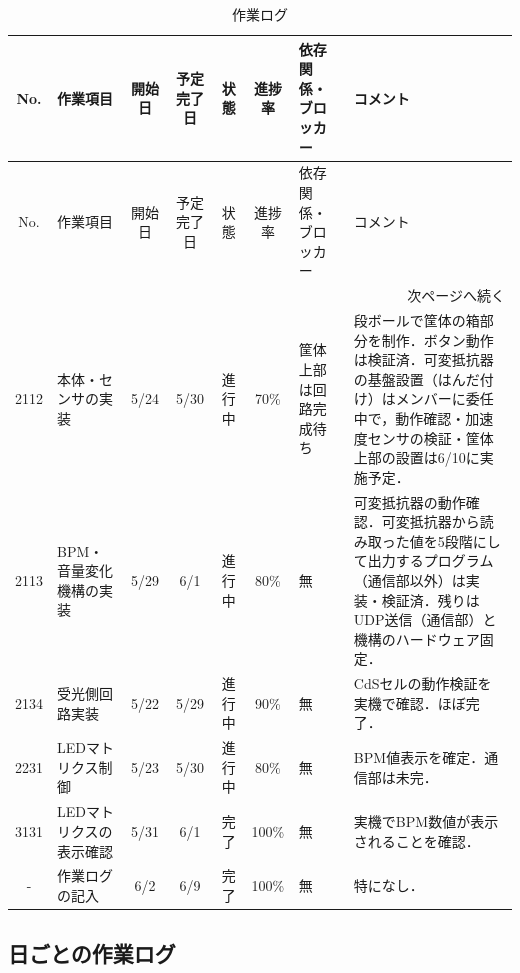 \documentclass[uplatex,dvipdfmx,a4paper,11pt]{jsarticle}
\begin{document}
\renewcommand{\arraystretch}{1.2}

\small

\begin{longtable}{|c|p{2.2cm}|c|c|c|c|p{2.4cm}|p{3.1cm}|}
\caption{作業ログ} \\
\hline
No. & 作業項目 & 開始日 & 予定完了日 & 状態 & 進捗率 & 依存関係・ブロッカー & コメント \\
\hline
\endfirsthead

\hline
No. & 作業項目 & 開始日 & 予定完了日 & 状態 & 進捗率 & 依存関係・ブロッカー & コメント \\
\hline
\endhead

\hline
\multicolumn{8}{r}{次ページへ続く} \\
\hline
\endfoot

\hline
\endlastfoot

2112 &
本体・センサの実装 &
5/24 &
5/30 &
進行中 &
70\% &
筐体上部は回路完成待ち &
段ボールで筐体の箱部分を制作．ボタン動作は検証済．可変抵抗器の基盤設置（はんだ付け）はメンバーに委任中で，動作確認・加速度センサの検証・筐体上部の設置は6/10に実施予定． \\
\hline

2113 &
BPM・音量変化機構の実装 &
5/29 &
6/1 &
進行中 &
80\% &
無 &
可変抵抗器の動作確認．可変抵抗器から読み取った値を5段階にして出力するプログラム（通信部以外）は実装・検証済．残りはUDP送信（通信部）と機構のハードウェア固定． \\
\hline

2134 &
受光側回路実装 &
5/22 &
5/29 &
進行中 &
90\% &
無 &
CdSセルの動作検証を実機で確認．ほぼ完了．\\
\hline

2231 &
LEDマトリクス制御 &
5/23 &
5/30 &
進行中 &
80\% &
無 &
BPM値表示を確定．通信部は未完． \\
\hline

3131 &
LEDマトリクスの表示確認 &
5/31 &
6/1 &
完了 &
100\% &
無 &
実機でBPM数値が表示されることを確認． \\
\hline

- &
作業ログの記入 &
6/2 &
6/9 &
完了 &
100\% &
無 &
特になし． \\
\hline



\end{longtable}


\subsection{日ごとの作業ログ}
\end{document}

